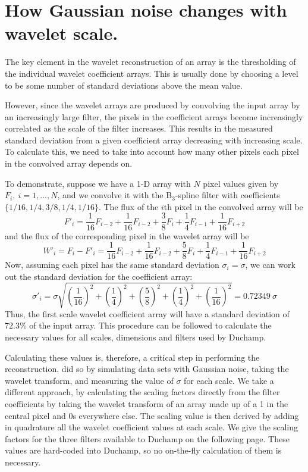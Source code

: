 \documentclass[12pt,a4paper]{article}
\begin{document}
\section{How Gaussian noise changes with wavelet scale.}
\label{app-scaling}

The key element in the wavelet reconstruction of an array is the
thresholding of the individual wavelet coefficient arrays. This is
usually done by choosing a level to be some number of standard
deviations above the mean value.

However, since the wavelet arrays are produced by convolving the input
array by an increasingly large filter, the pixels in the coefficient
arrays become increasingly correlated as the scale of the filter
increases. This results in the measured standard deviation from a
given coefficient array decreasing with increasing scale. To calculate
this, we need to take into account how many other pixels each pixel in
the convolved array depends on.

To demonstrate, suppose we have a 1-D array with $N$ pixel values
given by $F_i,\ i=1,...,N$, and we convolve it with the B$_3$-spline
filter with coefficients $\{1/16,1/4,3/8,1/4,1/16\}$. The flux of the
$i$th pixel in the convolved array will be
\[
F'_i = \frac{1}{16}F_{i-2} + \frac{1}{16}F_{i-2} + \frac{3}{8}F_{i}
+ \frac{1}{4}F_{i-1} + \frac{1}{16}F_{i+2}
\]
and the flux of the corresponding pixel in the wavelet array will be 
\[
W'_i = F_i - F'_i = \frac{1}{16}F_{i-2} + \frac{1}{16}F_{i-2} + \frac{5}{8}F_{i}
+ \frac{1}{4}F_{i-1} + \frac{1}{16}F_{i+2}
\]
Now, assuming each pixel has the same standard deviation
$\sigma_i=\sigma$, we can work out the standard deviation for the
coefficient array:
\[
\sigma'_i = \sigma \sqrt{\left(\frac{1}{16}\right)^2 + \left(\frac{1}{4}\right)^2
  + \left(\frac{5}{8}\right)^2 + \left(\frac{1}{4}\right)^2 + \left(\frac{1}{16}\right)^2}
          = 0.72349\ \sigma
\]
Thus, the first scale wavelet coefficient array will have a standard
deviation of 72.3\% of the input array. This procedure can be followed
to calculate the necessary values for all scales, dimensions and
filters used by Duchamp.

Calculating these values is, therefore, a critical step in performing
the reconstruction. \citet{starck02:book} did so by simulating data sets
with Gaussian noise, taking the wavelet transform, and measuring the
value of $\sigma$ for each scale. We take a different approach, by
calculating the scaling factors directly from the filter coefficients
by taking the wavelet transform of an array made up of a 1 in the
central pixel and 0s everywhere else. The scaling value is then
derived by adding in quadrature all the wavelet coefficient values at
each scale. We give the scaling factors for the three filters
available to Duchamp on the following page. These values are
hard-coded into Duchamp, so no on-the-fly calculation of them is
necessary. 
\end{document}
